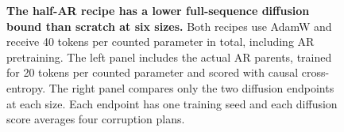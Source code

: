 \begin{figure}[t]
\centering

\caption{\textbf{The half-AR recipe has a lower full-sequence diffusion bound than scratch at six sizes.} Both recipes use AdamW and receive 40 tokens per counted parameter in total, including AR pretraining. The left panel includes the actual AR parents, trained for 20 tokens per counted parameter and scored with causal cross-entropy. The right panel compares only the two diffusion endpoints at each size. Each endpoint has one training seed and each diffusion score averages four corruption plans.}
\label{fig:scaling}
\end{figure}
